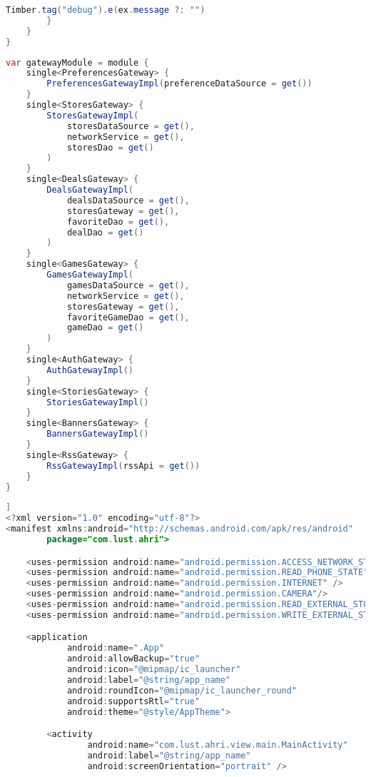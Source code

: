 \begin{asection}
\begin{lstlisting}[language=Java,label={lst:add:a_3}, caption={BaseViewModel}]
            Timber.tag("debug").e(ex.message ?: "")
        }
    }
}
\end{lstlisting}
\begin{lstlisting}[language=Java,label={lst:add:a_4}, caption={Koin}]
var gatewayModule = module {
    single<PreferencesGateway> {
        PreferencesGatewayImpl(preferenceDataSource = get())
    }
    single<StoresGateway> {
        StoresGatewayImpl(
            storesDataSource = get(),
            networkService = get(),
            storesDao = get()
        )
    }
    single<DealsGateway> {
        DealsGatewayImpl(
            dealsDataSource = get(),
            storesGateway = get(),
            favoriteDao = get(),
            dealDao = get()
        )
    }
    single<GamesGateway> {
        GamesGatewayImpl(
            gamesDataSource = get(),
            networkService = get(),
            storesGateway = get(),
            favoriteGameDao = get(),
            gameDao = get()
        )
    }
    single<AuthGateway> {
        AuthGatewayImpl()
    }
    single<StoriesGateway> {
        StoriesGatewayImpl()
    }
    single<BannersGateway> {
        BannersGatewayImpl()
    }
    single<RssGateway> {
        RssGatewayImpl(rssApi = get())
    }
}
\end{lstlisting}
\begin{lstlisting}[language=Java,label={lst:add:a_5}, caption={AndroidManifest.xml}]]
<?xml version="1.0" encoding="utf-8"?>
<manifest xmlns:android="http://schemas.android.com/apk/res/android"
        package="com.lust.ahri">

    <uses-permission android:name="android.permission.ACCESS_NETWORK_STATE" />
    <uses-permission android:name="android.permission.READ_PHONE_STATE" />
    <uses-permission android:name="android.permission.INTERNET" />
    <uses-permission android:name="android.permission.CAMERA"/>
    <uses-permission android:name="android.permission.READ_EXTERNAL_STORAGE" />
    <uses-permission android:name="android.permission.WRITE_EXTERNAL_STORAGE" />

    <application
            android:name=".App"
            android:allowBackup="true"
            android:icon="@mipmap/ic_launcher"
            android:label="@string/app_name"
            android:roundIcon="@mipmap/ic_launcher_round"
            android:supportsRtl="true"
            android:theme="@style/AppTheme">

        <activity
                android:name="com.lust.ahri.view.main.MainActivity"
                android:label="@string/app_name"
                android:screenOrientation="portrait" />


\end{lstlisting}
\end{asection}
